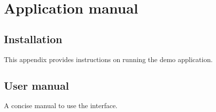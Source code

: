 \appendix
\chapter{Application manual}
\label{appendix:applicationmanual}

\section{Installation}
\label{section:installation}
This appendix provides instructions on running the demo application.

\section{User manual}
\label{section:usermanual}
A concise manual to use the interface.